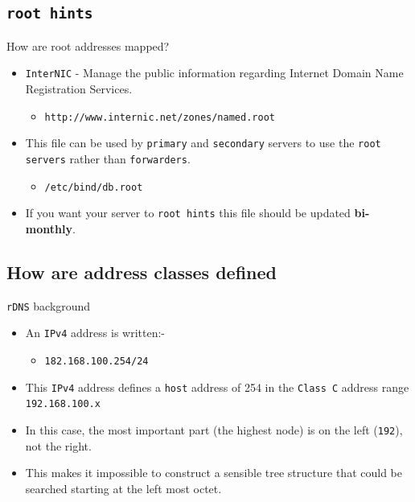 \documentclass[xcolor=table]{beamer}
\begin{document}
\subsection{\texttt{root hints}}
\begin{frame}{How are root addresses mapped?}
  \begin{itemize}
    \item \texttt{InterNIC} - Manage the public information regarding Internet Domain Name Registration Services. 
      \begin{itemize}
        \item \texttt{http://www.internic.net/zones/named.root} 
      \end{itemize}
    \item This file can be used by \texttt{primary} and \texttt{secondary} servers to use the \texttt{root servers} rather than \texttt{forwarders}.
      \begin{itemize}
        \item \texttt{/etc/bind/db.root} 
      \end{itemize}
    \item If you want your server to \texttt{root hints} this file should be updated \textbf{bi-monthly}.
  \end{itemize}
\end{frame}

\subsection{How are address classes defined}
\begin{frame}{\texttt{rDNS} background}
  \begin{itemize}
    \item An \texttt{IPv4} address is written:-
      \begin{itemize}
        \item \texttt{182.168.100.254/24} 
      \end{itemize}
    \item This \texttt{IPv4} address defines a \texttt{host} address of 254 in the \texttt{Class C} address range \texttt{192.168.100.x}
    \item In this case, the most important part (the highest node) is on the left (\texttt{192}), not the right. 
    \item This makes it impossible to construct a sensible tree structure that could be searched starting at the left most octet.
  \end{itemize}
\end{frame}
\end{document}
